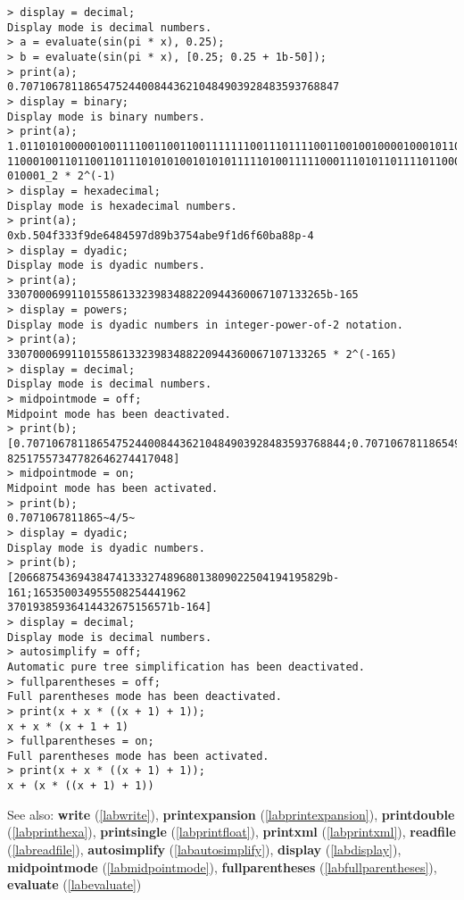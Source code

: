\begin{center}\begin{minipage}{15cm}\begin{Verbatim}[frame=single]
> display = decimal;
Display mode is decimal numbers.
> a = evaluate(sin(pi * x), 0.25);
> b = evaluate(sin(pi * x), [0.25; 0.25 + 1b-50]);
> print(a);
0.70710678118654752440084436210484903928483593768847
> display = binary;
Display mode is binary numbers.
> print(a);
1.011010100000100111100110011001111111001110111100110010010000100010110010111110
11000100110110011011101010100101010111110100111110001110101101111011000001011101
010001_2 * 2^(-1)
> display = hexadecimal;
Display mode is hexadecimal numbers.
> print(a);
0xb.504f333f9de6484597d89b3754abe9f1d6f60ba88p-4
> display = dyadic;
Display mode is dyadic numbers.
> print(a);
33070006991101558613323983488220944360067107133265b-165
> display = powers;
Display mode is dyadic numbers in integer-power-of-2 notation.
> print(a);
33070006991101558613323983488220944360067107133265 * 2^(-165)
> display = decimal;
Display mode is decimal numbers.
> midpointmode = off;
Midpoint mode has been deactivated.
> print(b);
[0.70710678118654752440084436210484903928483593768844;0.707106781186549497437217
82517557347782646274417048]
> midpointmode = on;
Midpoint mode has been activated.
> print(b);
0.7071067811865~4/5~
> display = dyadic;
Display mode is dyadic numbers.
> print(b);
[2066875436943847413332748968013809022504194195829b-161;165350034955508254441962
37019385936414432675156571b-164]
> display = decimal;
Display mode is decimal numbers.
> autosimplify = off;
Automatic pure tree simplification has been deactivated.
> fullparentheses = off;
Full parentheses mode has been deactivated.
> print(x + x * ((x + 1) + 1));
x + x * (x + 1 + 1)
> fullparentheses = on;
Full parentheses mode has been activated.
> print(x + x * ((x + 1) + 1));
x + (x * ((x + 1) + 1))
\end{Verbatim}
\end{minipage}\end{center}
See also: \textbf{write} (\ref{labwrite}), \textbf{printexpansion} (\ref{labprintexpansion}), \textbf{printdouble} (\ref{labprinthexa}), \textbf{printsingle} (\ref{labprintfloat}), \textbf{printxml} (\ref{labprintxml}), \textbf{readfile} (\ref{labreadfile}), \textbf{autosimplify} (\ref{labautosimplify}), \textbf{display} (\ref{labdisplay}), \textbf{midpointmode} (\ref{labmidpointmode}), \textbf{fullparentheses} (\ref{labfullparentheses}), \textbf{evaluate} (\ref{labevaluate})
